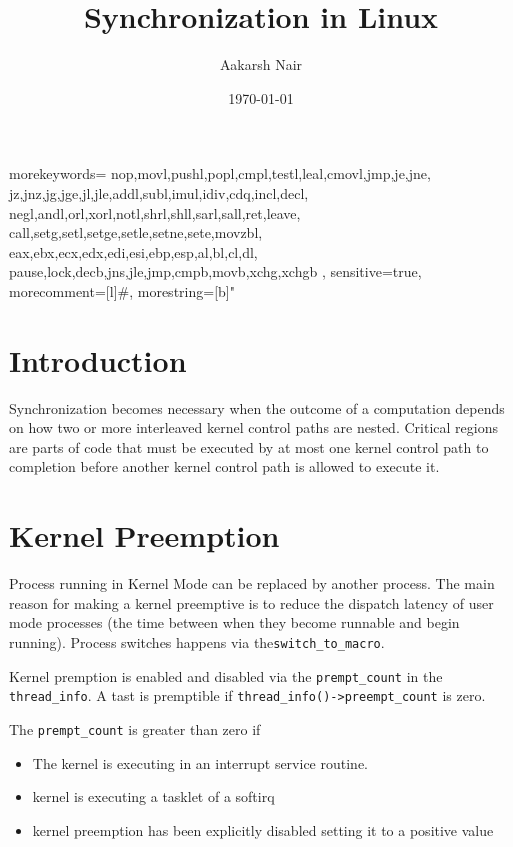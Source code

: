 \documentclass{article}
\title{Synchronization in Linux}
\author{Aakarsh Nair}
\date{\today}
\begin{document}
 {
	morekeywords={
		nop,movl,pushl,popl,cmpl,testl,leal,cmovl,jmp,je,jne,
		jz,jnz,jg,jge,jl,jle,addl,subl,imul,idiv,cdq,incl,decl,
		negl,andl,orl,xorl,notl,shrl,shll,sarl,sall,ret,leave,
		call,setg,setl,setge,setle,setne,sete,movzbl,
		eax,ebx,ecx,edx,edi,esi,ebp,esp,al,bl,cl,dl,
                pause,lock,decb,jns,jle,jmp,cmpb,movb,xchg,xchgb
	},
	sensitive=true,
	morecomment=[l]{\#},
	morestring=[b]"
}

\lstset{language=C}  
\maketitle

\setcounter{tocdepth}{3}
\tableofcontents

\maketitle
\vspace*{1cm}

\section{Introduction}

Synchronization becomes necessary when the outcome of a computation
depends on how two or more interleaved kernel control paths are
nested. Critical regions are parts of code that must be executed by at
most one kernel control path to completion before another kernel
control path is allowed to execute it.


\section{Kernel Preemption}

Process running in Kernel Mode can be replaced by another process.
The main reason for making a kernel preemptive is to reduce the
dispatch latency of user mode processes (the time between when they
become runnable and begin running).  Process switches happens via
the\lstinline{switch_to_macro}.

Kernel premption is enabled and disabled via the
\lstinline{prempt_count} in the \lstinline{thread_info}. A tast is
premptible if \lstinline{thread_info()->preempt_count} is zero.

The \lstinline{prempt_count} is greater than zero if 

\begin{itemize}
\item The kernel is executing in an interrupt service routine.
\item kernel is executing a tasklet of a softirq
\item kernel preemption has been explicitly disabled setting it to a
  positive value
\end{itemize}
\end{document}
